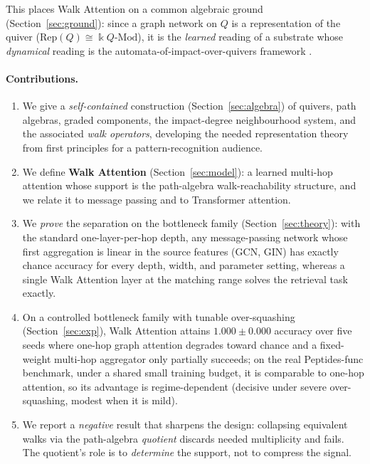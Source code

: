 \documentclass[runningheads]{llncs}
\newcommand{\kk}{\Bbbk}                 %
\newcommand{\kQ}{\kk Q}                 %
\begin{document}
This places Walk Attention on a common algebraic ground (Section~\ref{sec:ground}):
since a graph network on $Q$ is a representation of the quiver
($\mathrm{Rep}(Q)\cong\kQ\text{-}\mathrm{Mod}$), it is the \emph{learned}
reading of a substrate whose \emph{dynamical} reading is the
automata-of-impact-over-quivers framework \cite{zainea2026aiq}.

\paragraph{Contributions.}
\begin{enumerate}
  \item We give a \emph{self-contained} construction (Section~\ref{sec:algebra})
  of quivers, path algebras, graded components, the impact-degree neighbourhood
  system, and the associated \emph{walk operators}, developing the needed
  representation theory from first principles for a pattern-recognition audience.
  \item We define \textbf{Walk Attention} (Section~\ref{sec:model}): a learned
  multi-hop attention whose support is the path-algebra walk-reachability
  structure, and we relate it to message passing and to Transformer attention.
  \item We \emph{prove} the separation on the bottleneck family
  (Section~\ref{sec:theory}): with the standard one-layer-per-hop depth, any
  message-passing network whose first aggregation is linear in the source
  features (GCN, GIN) has exactly chance accuracy for every depth, width, and
  parameter setting, whereas a single Walk Attention layer at the matching
  range solves the retrieval task exactly.
  \item On a controlled bottleneck family with tunable over-squashing
  (Section~\ref{sec:exp}), Walk Attention attains $1.000\pm0.000$ accuracy over
  five seeds where one-hop graph attention degrades toward chance and a
  fixed-weight multi-hop aggregator only partially succeeds; on the real
  Peptides-func benchmark, under a shared small training budget, it is
  comparable to one-hop attention, so its advantage is regime-dependent
  (decisive under severe over-squashing, modest when it is mild).
  \item We report a \emph{negative} result that sharpens the design: collapsing
  equivalent walks via the path-algebra \emph{quotient} discards needed
  multiplicity and fails. The quotient's role is to \emph{determine} the support, not
  to compress the signal.
\end{enumerate}
\end{document}
